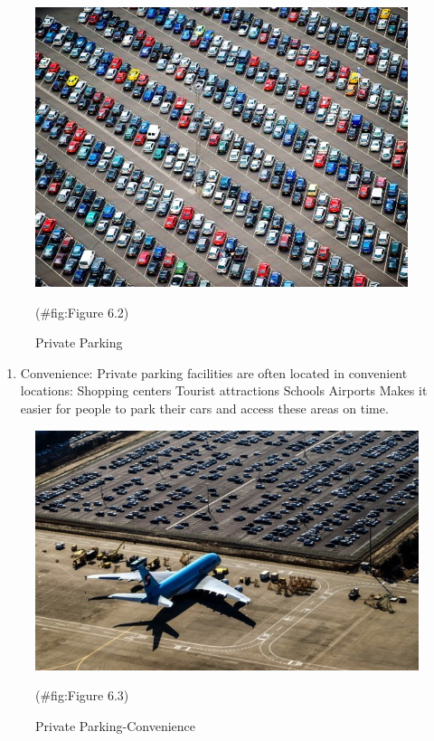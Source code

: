 \documentclass[
]{book}
\providecommand{\tightlist}{%
  \setlength{\itemsep}{0pt}\setlength{\parskip}{0pt}}
\begin{document}
\begin{figure}

{\centering \includegraphics{./Images/Parking/Private Parking} 

}

\caption{Private Parking}(\#fig:Figure 6.2)
\end{figure}

\begin{enumerate}
\def\labelenumi{\arabic{enumi}.}
\setcounter{enumi}{1}
\tightlist
\item
  Convenience:
  Private parking facilities are often located in convenient locations:
  Shopping centers
  Tourist attractions
  Schools
  Airports
  Makes it easier for people to park their cars and access these areas on time.
\end{enumerate}

\begin{figure}

{\centering \includegraphics{./Images/Parking/Private Parking-Convenience} 

}

\caption{Private Parking-Convenience}(\#fig:Figure 6.3)
\end{figure}
\end{document}
